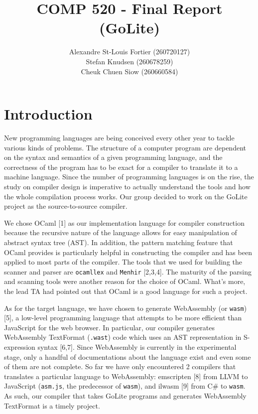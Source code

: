\documentclass{article}
\begin{document}
\title{COMP 520 - Final Report (GoLite)}
\author{
Alexandre St-Louis Fortier (260720127)\\
Stefan Knudsen (260678259)\\
Cheuk Chuen Siow (260660584)}
\maketitle

\raggedright
\section{Introduction}
New programming languages are being conceived every other year to tackle various kinds of problems. The structure of a computer program are dependent on the syntax and semantics of a given programming language, and the correctness of the program has to be exact for a compiler to translate it to a machine language. Since the number of programming languages is on the rise, the study on compiler design is imperative to actually understand the tools and how the whole compilation process works. Our group decided to work on the GoLite project as the source-to-source compiler.

We chose OCaml [1] as our implementation language for compiler construction because the recursive nature of the language allows for easy manipulation of abstract syntax tree (AST). In addition, the pattern matching feature that OCaml provides is particularly helpful in constructing the compiler and has been applied to most parts of the compiler. The tools that we used for building the scanner and parser are \verb|ocamllex| and \verb|Menhir| [2,3,4]. The maturity of the parsing and scanning tools were another reason for the choice of OCaml. What's more, the lead TA had pointed out that OCaml is a good language for such a project.

As for the target language, we have chosen to generate WebAssembly (or \verb|wasm|) [5], a low-level programming language that attempts to be more efficient than JavaScript for the web browser. In particular, our compiler generates WebAssembly TextFormat (\verb|.wast|) code which uses an AST representation in S-expression syntax [6,7]. Since WebAssembly is currently in the experimental stage, only a handful of documentations about the language exist and even some of them are not complete. So far we have only encountered 2 compilers that translates a particular language to WebAssembly: emscripten [8] from LLVM to JavaScript (\verb|asm.js|, the predecessor of \verb|wasm|), and ilwasm [9] from C\# to \verb|wasm|. As such, our compiler that takes GoLite programs and generates WebAssembly TextFormat is a timely project.
\end{document}
